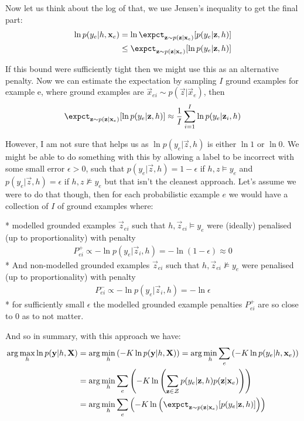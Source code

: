 Now let us think about the log of that, we use Jensen's inequality to get the final part:
\begin{align}
\ln p(y_e|h, \vec{x}_e)
&= \ln \expct_{\vec{z} \sim p(\vec{z}| \vec{x}_e)}[p(y_e|\vec{z},h)] \\
&\leq \expct_{\vec{z} \sim p(\vec{z}| \vec{x}_e)}[\ln  p(y_e|\vec{z},h)]
\end{align}

If this bound were sufficiently tight then we might use this as an alternative penalty. Now we can estimate the expectation by sampling $I$ ground examples for example e, where ground examples are $\vec{x}_{ei} \sim p(\vec{z}| \vec{x}_e)$, then 
\begin{align}
\expct_{\vec{z} \sim p(\vec{z}| \vec{x}_e)}[\ln  p(y_e|\vec{z},h)]
\approx \frac{1}{I} \sum_{i=1}^{I} \ln  p(y_e|\vec{z}_i,h)
\end{align}

However, I am not sure that helps us as $\ln p(y_e|\vec{z},h)$ is either $\ln 1$ or $\ln 0$. We might be able to do something with this by allowing a label to be incorrect with some small error $\epsilon > 0$, such that $p(y_e|\vec{z},h) = 1- \epsilon$ if $h, z \models y_e $ and $p(y_e|\vec{z},h) = \epsilon$ if $h, z \not\models y_e $ but that isn't the cleanest approach. Let's assume we were to do that though, then  for each probabilistic example $e$ we would have a collection of $I$ of ground examples where:

* modelled grounded examples $\vec{z}_{ei}$ such that $h, \vec{z}_{ei} \models y_e$ were (ideally) penalised (up to proportionality) with penalty
\begin{align}
P^{+}_{ei} \propto -\ln  p(y_e|\vec{z}_i,h) = -\ln (1- \epsilon) \approx 0
\end{align}
* And non-modelled grounded examples $\vec{z}_{ei}$ such that $h, \vec{z}_{ei} \not\models y_e$ were penalised (up to proportionality) with penalty
\begin{align}
P^{-}_{ei} \propto -\ln  p(y_e|\vec{z}_i,h) = -\ln \epsilon
\end{align}
* for sufficiently small $\epsilon$ the modelled grounded example penalties $P^{+}_{ei}$ are so close to $0$ as to not matter.

And so in summary, with this approach we have:
\begin{align}
\arg\max_{h} \ln p(\vec{y}|h, \vec{X}) 
& = \arg\min_{h} \left( -K \ln p(\vec{y}|h, \vec{X}) \right)
= \arg\min_{h} \sum_e \left( -K \ln p(y_e|h, \vec{x}_e) \right)\\
& = \arg\min_{h} \sum_e\left( -K \ln \left(\sum_{\vec{z} \in \curly{Z}} p(y_e|\vec{z},h)
p(\vec{z}| \vec{x}_e) \right) \right) \\
& = \arg\min_{h} \sum_e\left( -K \ln \left(\expct_{\vec{z} \sim p(\vec{z}| \vec{x}_e)}[p(y_e|\vec{z},h)] \right) \right) \\
\end{align}

